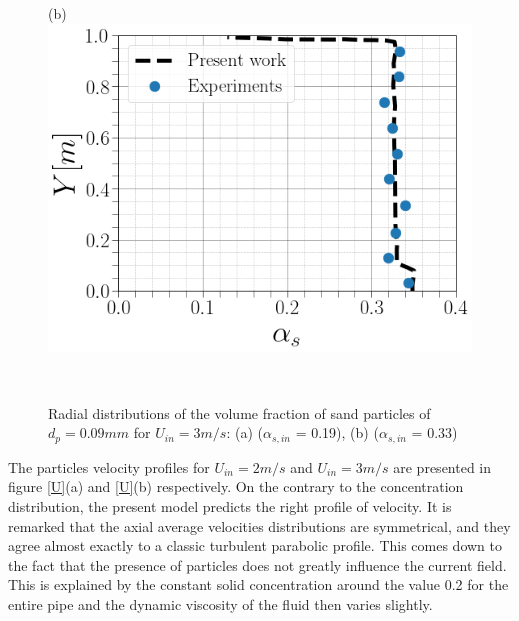 \documentclass[review,3p,times,12pt]{elsarticle}
\begin{document}
\begin{minipage}[t]{0.5\textwidth}
\begin{figure}[H]
\begin{center}
(b)\includegraphics[scale = 0.3]{figs/C33}
\end{center}
\end{figure}
\end{minipage}\\
\begin{figure}[H]
\centering
\caption{Radial distributions of the volume fraction of sand particles of $d_p= 0.09 mm$ for $U_{in} = 3 m/s$: (a) ($\alpha_{s,in}$ = 0.19), (b) ($\alpha_{s,in}$ = 0.33) }
\label{solid}
\end{figure}
The particles velocity  profiles for $U_{in} = 2 m/s$ and $U_{in} = 3 m/s$ are presented in figure \ref{U}(a) and \ref{U}(b) respectively. On the contrary to the concentration distribution, the present model predicts the right profile of velocity. It is remarked that the axial average velocities  distributions are symmetrical, and they agree almost exactly to a classic turbulent parabolic profile. This comes down to the fact that the presence of particles does not greatly influence the current field. This is explained by the constant solid concentration around the value 0.2 for the entire pipe and the dynamic viscosity of the fluid then varies slightly.\\
\end{document}
